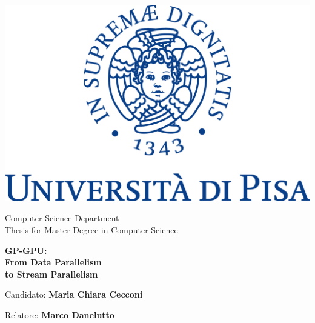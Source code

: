 
\begin{titlepage}
	\begin{center}	
		\includegraphics{images/logo_unipi}
		
		\vspace*{1cm}
		\normalsize{					
			Computer Science Department\\
			\vspace{0.5cm}		
			Thesis for Master Degree in Computer Science
		}
		\vspace*{1 cm}
		
		
		\huge{ \textbf{GP-GPU: \\  From 	 Data Parallelism \\ to Stream  Parallelism} }
		
		
		
		\vspace{1.0cm}
	\end{center}
	
	\vfill
	\vspace*{1.5cm}
	
	\begin{flushright}
		\Large{	
			Candidato: \textbf{Maria Chiara Cecconi}
			
			\vspace{0.5cm}
			
			Relatore: \textbf{Marco Danelutto}
		}
	\end{flushright}				
\end{titlepage}
%	
